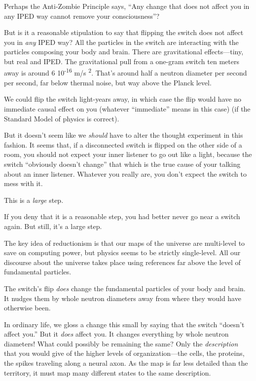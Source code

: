 {
 Perhaps the Anti-Zombie Principle says, ``Any
change that does not affect you in any IPED way cannot remove your
consciousness''?}

{
 But is it a reasonable stipulation to say that flipping the switch
does not affect you in \textit{any} IPED way? All the particles in the
switch are interacting with the particles composing your body and
brain. There are gravitational effects---tiny, but real and IPED. The
gravitational pull from a one-gram switch ten meters away is around 6
{\texttimes} 10\textsuperscript{{}-16} m/s\textsuperscript{ 2}.
That's around half a neutron diameter per second per
second, far below thermal noise, but way above the Planck level.}

{
 We could flip the switch light-years away, in which case the flip
would have no immediate causal effect on you (whatever
``immediate'' means in this case)
(if the Standard Model of physics is correct).}

{
 But it doesn't seem like we \textit{should} have
to alter the thought experiment in this fashion. It seems that, if a
disconnected switch is flipped on the other side of a room, you should
not expect your inner listener to go out like a light, because the
switch ``obviously doesn't
change'' that which is the true cause of your talking
about an inner listener. Whatever you really are, you
don't expect the switch to mess with it.}

{
 This is a \textit{large} step.}

{
 If you deny that it is a reasonable step, you had better never go
near a switch again. But still, it's a large step.}

{
 The key idea of reductionism is that our maps of the universe are
multi-level to save on computing power, but physics seems to be
strictly single-level. All our discourse about the universe takes place
using references far above the level of fundamental particles.}

{
 The switch's flip \textit{does} change the
fundamental particles of your body and brain. It nudges them by whole
neutron diameters away from where they would have otherwise been.}

{
 In ordinary life, we gloss a change this small by saying that the
switch ``doesn't affect
you.'' But it \textit{does} affect you. It changes
everything by whole neutron diameters! What could possibly be remaining
the same? Only the \textit{description} that you would give of the
higher levels of organization---the cells, the proteins, the spikes
traveling along a neural axon. As the map is far less detailed than the
territory, it must map many different states to the same description.}

